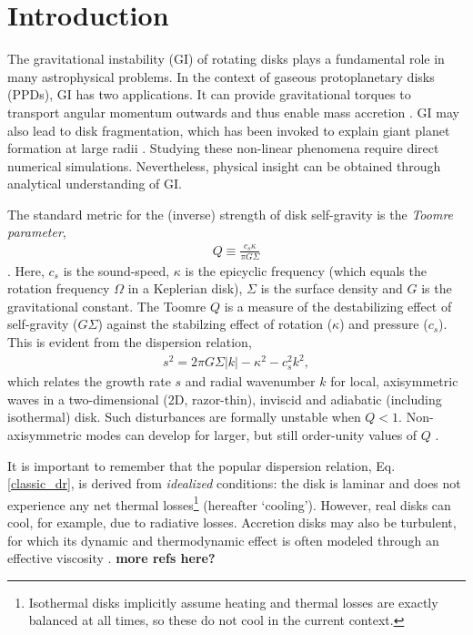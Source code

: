 \documentclass[iop, numberedappendix]{emulateapj}
\begin{document}
\section{Introduction}\label{intro} 
The gravitational instability (GI) of rotating disks    
plays a fundamental role in many astrophysical problems. In the context of 
gaseous protoplanetary disks (PPDs), GI has two applications. It can  
provide gravitational torques to transport angular momentum outwards
and thus enable mass accretion \citep{armitage10,turner14}.   
GI may also lead to disk fragmentation, which has been invoked to 
explain giant planet formation at large radii
\citep{helled14}. Studying these non-linear phenomena require direct      
numerical simulations. Nevertheless, physical insight can be  
obtained through analytical understanding of GI. 

The standard metric for the (inverse) strength of disk self-gravity is
the \emph{Toomre parameter}, 
\begin{align}\label{toomreQ_criterion}
  Q \equiv \frac{c_s\kappa}{\pi G \Sigma}  
\end{align}
\citep{toomre64}. Here, $c_s$ is the sound-speed,
$\kappa$ is the epicyclic frequency (which equals the rotation
frequency $\Omega$ in a Keplerian disk), $\Sigma$ is the surface
density and $G$ is the gravitational constant. The Toomre $Q$ is a
measure of the destabilizing effect of self-gravity ($G\Sigma$) against 
the stabilzing effect of rotation ($\kappa$) and pressure 
($c_s$). This is evident from the dispersion relation, 
\begin{align}\label{classic_dr}
  s^2 =  2\pi G\Sigma|k| - \kappa^2 - c_s^2k^2,   
\end{align}
which relates the growth rate $s$ and radial wavenumber $k$ for local,
axisymmetric waves in a two-dimensional (2D, razor-thin), inviscid and
adiabatic (including isothermal) disk. Such disturbances are formally
unstable when $Q<1$. Non-axisymmetric modes can develop for larger,
but still order-unity values of $Q$
\citep{papaloizou89,papaloizou91}. 

It is important to remember that the popular dispersion relation, 
Eq. \ref{classic_dr},  is derived from \emph{idealized} conditions: 
the disk is laminar and does not experience any net thermal
losses\footnote{Isothermal disks implicitly assume  
  heating and thermal losses are exactly balanced at all 
  times, so these do not cool in the current context.} 
(hereafter `cooling').  
However, real disks can cool, for example, %
due to radiative losses. Accretion disks may also be turbulent, for
which its dynamic and thermodynamic effect is often modeled through an
effective viscosity \citep{shakura73,lin87,rafikov15}. {\bf 
  more refs here?} 
\end{document}
